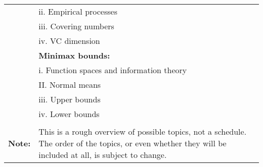 \documentclass[11pt]{article}
\begin{document}
\begin{table}[!h]
\begin{tabular}{lp{6in}}
           & ii. Empirical processes \\
           & iii. Covering numbers \\
           & iv. VC dimension \\
 &   \textbf{Minimax bounds:} \\
          & i. Function spaces and information theory \\
          & II. Normal means  \\
           & iii. Upper bounds \\
           & iv. Lower bounds \\
\\
\textbf{Note:} & This is a rough overview of possible topics, not a schedule. 
The order of the topics, or even whether they will be included at
all, is subject to change.
\end{tabular}
\end{table}
\end{document}
